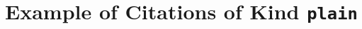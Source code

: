 \documentclass {article}
\begin{document}
\section*{Example of Citations of Kind \texttt{plain}}








\end{document}
